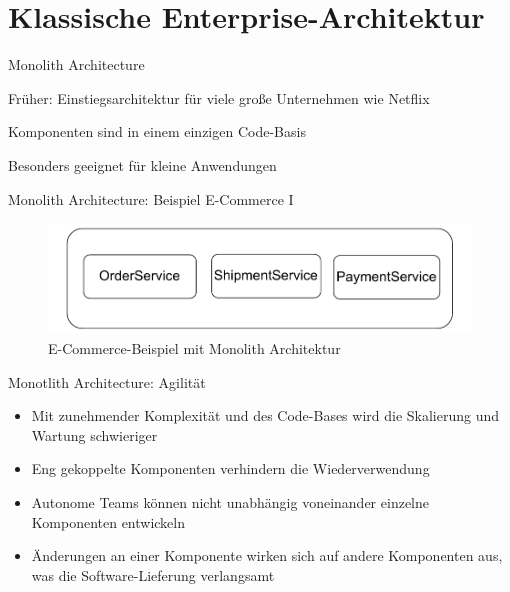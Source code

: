 \section{Klassische Enterprise-Architektur}




\begin{frame}{Monolith Architecture}
    \item Früher: Einstiegsarchitektur für viele große Unternehmen wie Netflix
    \item Komponenten sind in einem einzigen Code-Basis
    \item Besonders geeignet für kleine Anwendungen
\end{frame}



\begin{frame}{Monolith Architecture: Beispiel E-Commerce I}
    \begin{figure}[!h]
        \centering
        \includegraphics[scale=0.70]{imglib/mono/mono}
        \caption{E-Commerce-Beispiel mit Monolith Architektur}
        \label{fig:mono-ecommerce}
    \end{figure}
\end{frame}

\begin{frame}{Monotlith Architecture: Agilität}
    \begin{itemize}
        \item Mit zunehmender Komplexität und des Code-Bases wird die Skalierung und Wartung schwieriger
        \item Eng gekoppelte Komponenten verhindern die Wiederverwendung
        \item Autonome Teams können nicht unabhängig voneinander einzelne Komponenten entwickeln
        \item Änderungen an einer Komponente wirken sich auf andere Komponenten aus, was die Software-Lieferung verlangsamt
    \end{itemize}
\end{frame}

